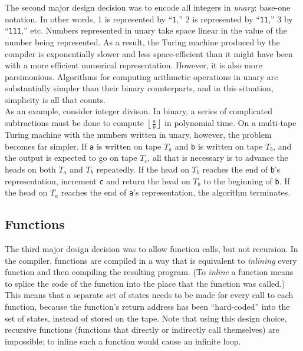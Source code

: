 The second major design decision was to encode all integers in \emph{unary}: base-one notation. In other words, 1 is represented by ``\texttt{1},'' 2 is represented by ``\texttt{11},'' 3 by ``\texttt{111},'' etc. Numbers represented in unary take space linear in the value of the number being represented. As a result, the Turing machine produced by the compiler is exponentially slower and less space-efficient than it might have been with a more efficient numerical representation. However, it is also more parsimonious. Algorithms for computing arithmetic operations in unary are substantially simpler than their binary counterparts, and in this situation, simplicity is all that counts. \\

As an example, consider integer divison. In binary, a series of complicated subtractions must be done to compute $\left \lfloor{\frac{a}{b}}\right \rfloor$ in polynomial time. On a multi-tape Turing machine with the numbers written in unary, however, the problem becomes far simpler. If \texttt{a} is written on tape $T_a$ and \texttt{b} is written on tape $T_b$, and the output is expected to go on tape $T_c$, all that is necessary is to advance the heads on both $T_a$ and $T_b$ repeatedly. If the head on $T_b$ reaches the end of \texttt{b}'s representation, increment \texttt{c} and return the head on $T_b$ to the beginning of \texttt{b}. If the head on $T_a$ reaches the end of \texttt{a}'s representation, the algorithm terminates. \\

\subsection{Functions \label{sec:functions}}

The third major design decision was to allow function calls, but not recursion. In the compiler, functions are compiled in a way that is equivalent to \emph{inlining} every function and then compiling the resulting program. (To \emph{inline} a function means to splice the code of the function into the place that the function was called.) This means that a separate set of states needs to be made for every call to each function, because the function's return address has been ``hard-coded'' into the set of states, instead of stored on the tape. Note that using this design choice, recursive functions (functions that directly or indirectly call themselves) are impossible: to inline such a function would cause an infinite loop. \\

